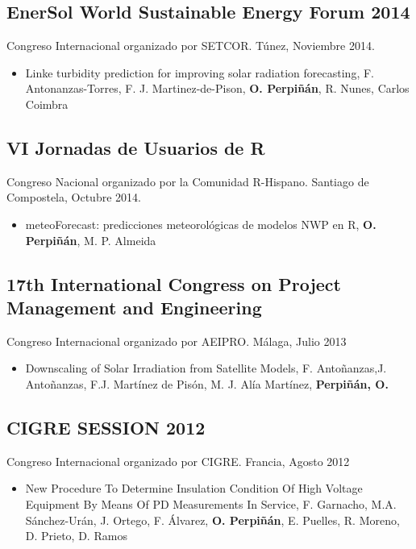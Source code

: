 \documentclass[article, a4paper]{memoir}
\begin{document}
\subsection{EnerSol World Sustainable Energy Forum 2014}
\label{sec:org2d506d5}
Congreso Internacional organizado por SETCOR. Túnez, Noviembre 2014.

\begin{itemize}
\item Linke turbidity prediction for improving solar radiation forecasting, F. Antonanzas-Torres, F. J. Martinez-de-Pison, \textbf{O. Perpiñán}, R. Nunes, Carlos Coimbra
\end{itemize}

\subsection{VI Jornadas de Usuarios de R}
\label{sec:org9d93f78}
Congreso Nacional organizado por la Comunidad R-Hispano. Santiago de Compostela, Octubre 2014. 

\begin{itemize}
\item meteoForecast: predicciones meteorológicas de modelos NWP en R, \textbf{O. Perpiñán}, M. P. Almeida
\end{itemize}

\subsection{17th International Congress on  Project Management and Engineering}
\label{sec:orgdf0dfdc}
Congreso Internacional organizado por AEIPRO. Málaga, Julio 2013

\begin{itemize}
\item Downscaling of Solar Irradiation from Satellite Models, F. Antoñanzas,J. Antoñanzas, F.J. Martínez de Pisón, M. J. Alía Martínez, \textbf{Perpiñán, O.}
\end{itemize}
\subsection{CIGRE SESSION 2012}
\label{sec:orgc4a582c}
Congreso Internacional organizado por CIGRE. Francia, Agosto 2012

\begin{itemize}
\item New Procedure To Determine Insulation Condition Of High Voltage Equipment By Means Of PD Measurements In Service, F. Garnacho, M.A. Sánchez-Urán, J. Ortego, F. Álvarez, \textbf{O. Perpiñán}, E. Puelles, R. Moreno, D. Prieto, D. Ramos
\end{itemize}
\end{document}
